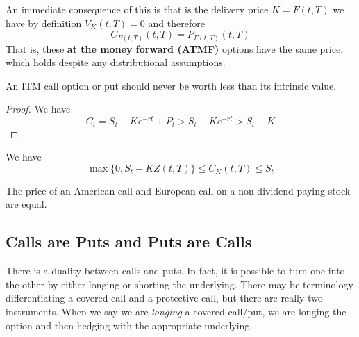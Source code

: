 \documentclass{article}
\begin{document}
    An immediate consequence of this is that is the delivery price $K = F(t, T)$ we have by definition $V_K (t, T) = 0$ and therefore 
    \begin{equation}
      C_{F(t, T)} (t, T) = P_{F(t, T)} (t, T)
    \end{equation}
    That is, these \textbf{at the money forward (ATMF)} options have the same price, which holds despite any distributional assumptions. 

    \begin{theorem}
      An ITM call option or put should never be worth less than its intrinsic value. 
    \end{theorem}
    \begin{proof}
      We have 
      \begin{equation}
        C_t = S_t - K e^{-rt} + P_t > S_t - K e^{-r t} > S_t - K
      \end{equation}
    \end{proof}

    \begin{theorem}
      We have 
      \begin{equation}
        \max\{0, S_t - K Z(t, T)\} \leq C_K (t, T) \leq S_t
      \end{equation}
    \end{theorem}

    \begin{corollary}
      The price of an American call and European call on a non-dividend paying stock are equal. 
    \end{corollary}

  \subsection{Calls are Puts and Puts are Calls}

    There is a duality between calls and puts. In fact, it is possible to turn one into the other by either longing or shorting the underlying. There may be terminology differentiating a covered call and a protective call, but there are really two instruments. When we say we are \textit{longing} a covered call/put, we are longing the option and then hedging with the appropriate underlying. 
\end{document}
